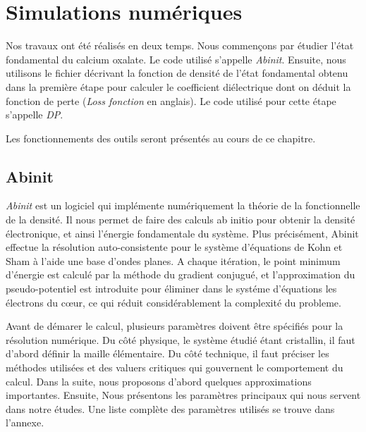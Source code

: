 \chapter{Simulations numériques}
\label{chapter-simulation}
Nos travaux ont été réalisés en deux temps.
Nous commençons par étudier l'état fondamental du calcium oxalate.
Le code utilisé s'appelle \textit{Abinit}.
Ensuite, nous utilisons le fichier décrivant la fonction de densité de l'état fondamental
obtenu dans la première étape pour calculer le coefficient diélectrique
dont on déduit la fonction de perte (\textit{Loss fonction} en anglais).
Le code utilisé pour cette étape s'appelle \textit{DP}.

Les fonctionnements des outils seront présentés au cours de ce chapitre.

\section{Abinit}
\label{sec-abinit}
\textit{Abinit} est un logiciel qui implémente numériquement la théorie de la fonctionnelle de la densité.
Il nous permet de faire des calculs ab initio pour obtenir la densité électronique,
et ainsi l'énergie fondamentale du système.
Plus précisément, Abinit effectue la résolution auto-consistente pour le système d'équations de Kohn et Sham à l'aide une base d'ondes planes.
A chaque itération, le point minimum d'énergie est calculé par la méthode du gradient conjugué,
et l'approximation du pseudo-potentiel est introduite pour éliminer dans le systéme d'équations les électrons du cœur,
ce qui réduit considérablement la complexité du probleme.

Avant de démarer le calcul,
plusieurs paramètres doivent être spécifiés pour la résolution numérique.
Du côté physique, le système étudié étant cristallin,
il faut d'abord définir la maille élémentaire.
Du côté technique, il faut préciser les méthodes utilisées et des valuers critiques qui gouvernent le comportement du calcul.
Dans la suite, nous proposons d'abord quelques approximations importantes. Ensuite,
Nous présentons les paramètres principaux qui nous servent dans notre études.
Une liste complète des paramètres utilisés se trouve dans l'annexe.

